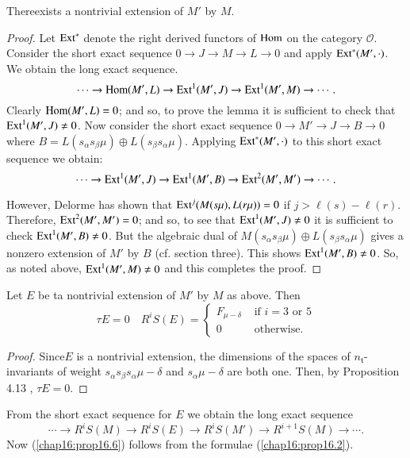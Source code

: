 \begin{lemma}\label{chap16:lem16.5}
There\pageoriginale  exists a nontrivial extension of $M'$ by $M$. 
\end{lemma}

\begin{proof}
Let $\operatorname{Ext}^*$ denote the right derived functors of $\operatorname{Hom}$ on the
category $\mathscr{O}$. Consider the short exact sequence $0 \to J \to
M \to L  \to 0$ and apply $\operatorname{Ext}^*(M',\cdot)$. We obtain the long exact
sequence. 
$$
\cdots \to \operatorname{Hom} (M', L) \to \operatorname{Ext}^1 (M', J) \to \operatorname{Ext}^1 (M', M)  \to
\cdots .
$$
Clearly $\operatorname{Hom} (M', L) = 0$; and so, to prove the lemma it is
sufficient to check that $\operatorname{Ext}^1(M', J) \neq 0$. Now consider the
short exact sequence $0 \to M' \to J \to B \to 0$ where $B =
L(s_\alpha s_\beta \mu) \oplus L(s_\beta s_\alpha \mu)$. Applying
$\operatorname{Ext}^*(M', \cdot)$ to this short exact sequence we obtain:
$$
\cdots \to \operatorname{Ext}^1(M', J) \to \operatorname{Ext}^1 (M', B) \to \operatorname{Ext}^2(M', M') \to
\cdots . 
$$

However, Delorme has shown that $\operatorname{Ext}^j (M(s\mu), L(r\mu)) =0$ if $j >
\ell (s) - \ell (r)$. Therefore, $\operatorname{Ext}^2 (M', M' ) = 0$; and so, to
see that $\Ext^1 (M',\break J) \neq 0$ it is sufficient to check $\operatorname{Ext}^1(M',
B) \neq 0$. But the algebraic dual of $M(s_\alpha s_\beta \mu) \oplus
L(s_\beta s_\alpha \mu)$ gives a nonzero extension of $M'$ by $B$
(cf. section three). This shows $\operatorname{Ext}^1(M', B) \neq 0$. So, as noted
above, $\operatorname{Ext}^1(M', M) \neq 0$ and this completes the proof.  
 \end{proof}

\begin{prop}\label{chap16:prop16.6}
Let $E$ be ta nontrivial extension of $M'$ by $M$ as above. Then 
$$
\tau E = 0 \quad R^i S(E) = 
\begin{cases}
F_{\mu - \delta} & \text{ if } i = 3 \text{ or } 5\\
0 & \text{ otherwise}. 
\end{cases}
$$
\end{prop}

\begin{proof}
Since\pageoriginale $E$ is a nontrivial extension, the dimensions of
the spaces of $n_\mathfrak{t}$-invariants of weight $s_\alpha s_\beta
s_\alpha \mu -\delta$ and $s_\alpha \mu - \delta$ are both one. Then,
by Proposition 4.13 \cite{key15}, $\tau E = 0$. 
\end{proof}

From the short exact sequence for $E$ we obtain the long exact
sequence 
$$
\cdots  \to R^i S(M) \to R^i S(E) \to R^i S(M') \to R^{i+1} S(M) \to
\cdots . 
$$
Now (\ref{chap16:prop16.6}) follows from the formulae (\ref{chap16:prop16.2}). 

